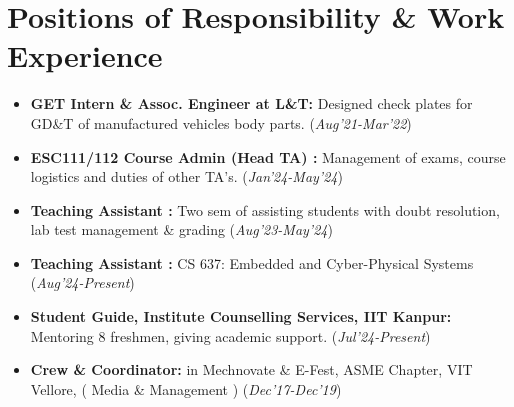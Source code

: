 \documentclass[10.8pt, a4paper]{extarticle}
\newcommand{\shorterSection}[1]{\vspace{-10pt}\section{#1}}
\begin{document}
\shorterSection{Positions of Responsibility \& Work Experience}
\begin{itemize}

\item \textbf{GET Intern \& Assoc. Engineer at L\&T:} Designed check plates for GD\&T of manufactured vehicles body parts. \href{https://drive.google.com/file/d/1OrfxyGyHMvoRFeCne3UPIx8iQgQaKPqk/view?usp=sharing}{\faLink{}} \href{https://drive.google.com/file/d/1JMF9GNNZ7MU2pVo0j9vEk110BOJtHZgV/view?usp=sharing}{\faLink{}}  \hfill\hfill(\textit{Aug'21-Mar'22})  \\[0cm]

\item \textbf{ESC111/112 Course Admin (Head TA) :} Management of exams, course logistics and duties of other TA's. \hfill\hfill(\textit{Jan'24-May'24})  \\[-0.6cm]

\item \textbf{Teaching Assistant :} Two sem of assisting students with doubt resolution, lab test management \& grading \hfill\hfill(\textit{Aug'23-May'24})  \\[-0.6cm]

\item \textbf{Teaching Assistant :} CS 637: Embedded and Cyber-Physical Systems \hfill\hfill(\textit{Aug'24-Present})  \\[-0.6cm]

\item \textbf{Student Guide, Institute Counselling Services, IIT Kanpur:} Mentoring 8 freshmen, giving academic support. \hfill\hfill(\textit{Jul'24-Present})\\[-0.6cm]

\item \textbf{Crew \& Coordinator: }in Mechnovate \& E-Fest, ASME Chapter, VIT Vellore, ( Media \& Management ) 
\href{https://drive.google.com/file/d/1skeeRg3UISDUtRxwI7Nfen7c6zbsuysX/view?usp=sharing}{\faLink{}} \hfill\hfill(\textit{Dec'17-Dec'19}) 

\vspace{2mm}
\end{itemize}


\end{document}
